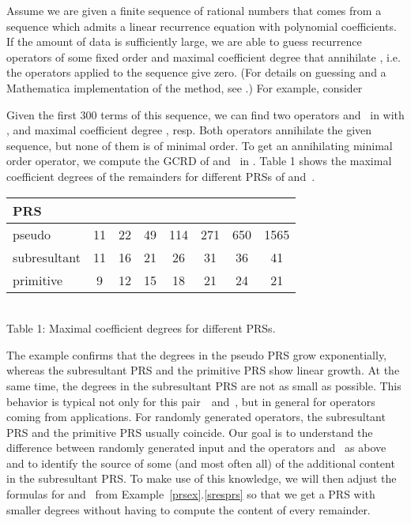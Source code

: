 \documentclass[3p,11pt,preprint]{elsarticle}
\begin{document}
\begin{example}
\label{mainex}
 Assume we are given a finite sequence of rational numbers that comes from a sequence  which admits a linear recurrence equation with polynomial coefficients. If the amount of data is sufficiently large, we are able to guess recurrence operators of some fixed order and maximal coefficient degree that annihilate , i.e. the operators applied to the sequence give zero. (For details on guessing and a Mathematica implementation of the method, see \cite{kauers}.)
 For example, consider 
 
 Given the first 300 terms of this sequence, we can find two operators  and~ in  with ,  and maximal coefficient degree ,  resp. Both operators annihilate the given sequence, but none of them is of minimal order. To get an annihilating minimal order operator, we compute the GCRD of  and~ in . Table 1 shows the maximal coefficient degrees of the remainders for different PRSs of  and~.
\begin{center}
\begin{tabular}{l|c|c|c|c|c|c|c}
PRS &  &  &  &  &  &  & \\
\hline
 pseudo & 11 & 22 & 49 & 114 & 271 & 650 & 1565\\
\hline
 subresultant & 11 & 16 & 21 & 26 & 31 & 36 & 41\\
\hline
 primitive & 9 & 12 & 15 & 18 & 21 & 24 & 21\\
\end{tabular}\\
\vspace{0.1cm}\scriptsize{Table 1: Maximal coefficient degrees for different PRSs.}
\end{center}
The example confirms that the degrees in the pseudo PRS grow exponentially, whereas the subresultant PRS and the primitive PRS show linear growth. At the same time, the degrees in the subresultant PRS are not as small as possible. This behavior is typical not only for this pair~~and~, but in general for operators coming from applications. For randomly generated operators, the subresultant PRS and the primitive PRS usually coincide. Our goal is to understand the difference between randomly generated input and the operators  and~ as above and to identify the source of some (and most often all) of the additional content in the subresultant PRS. To make use of this knowledge, we will then adjust the formulas for  and~ from Example~\ref{prsex}.\ref{sresprs} so that we get a PRS with smaller degrees without having to compute the content of every remainder.
\end{example}
\end{document}
